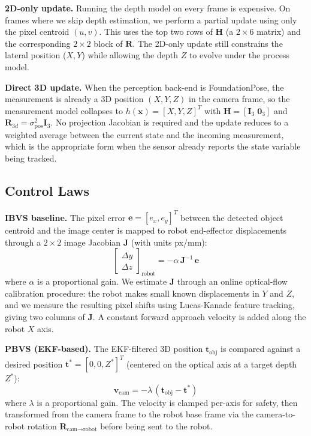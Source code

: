 \documentclass[letterpaper, 10 pt, conference]{ieeeconf}  %
\begin{document}
\textbf{2D-only update.}
Running the depth model on every frame is expensive. On frames where we skip depth estimation, we perform a partial update using only the pixel centroid $(u, v)$. This uses the top two rows of $\mathbf{H}$ (a $2 \times 6$ matrix) and the corresponding $2 \times 2$ block of $\mathbf{R}$. The 2D-only update still constrains the lateral position ($X, Y$) while allowing the depth $Z$ to evolve under the process model.

\textbf{Direct 3D update.}
When the perception back-end is FoundationPose, the measurement is already a 3D position $(X, Y, Z)$ in the camera frame, so the measurement model collapses to $h(\mathbf{x}) = [X, Y, Z]^T$ with $\mathbf{H} = [\mathbf{I}_3 \; \mathbf{0}_3]$ and $\mathbf{R}_{3d} = \sigma_{\text{pos}}^2 \mathbf{I}_3$. No projection Jacobian is required and the update reduces to a weighted average between the current state and the incoming measurement, which is the appropriate form when the sensor already reports the state variable being tracked.

\subsection{Control Laws}

\textbf{IBVS baseline.}
The pixel error $\mathbf{e} = [e_x, e_y]^T$ between the detected object centroid and the image center is mapped to robot end-effector displacements through a $2 \times 2$ image Jacobian $\mathbf{J}$ (with units px/mm):
\begin{equation}
\begin{bmatrix} \Delta y \\ \Delta z \end{bmatrix}_{\text{robot}} = -\alpha \, \mathbf{J}^{-1} \, \mathbf{e}
\end{equation}
where $\alpha$ is a proportional gain. We estimate $\mathbf{J}$ through an online optical-flow calibration procedure: the robot makes small known displacements in $Y$ and $Z$, and we measure the resulting pixel shifts using Lucas-Kanade feature tracking, giving two columns of $\mathbf{J}$. A constant forward approach velocity is added along the robot $X$ axis.

\textbf{PBVS (EKF-based).}
The EKF-filtered 3D position $\mathbf{t}_{\text{obj}}$ is compared against a desired position $\mathbf{t}^* = [0, 0, Z^*]^T$ (centered on the optical axis at a target depth $Z^*$):
\begin{equation}
\mathbf{v}_{\text{cam}} = -\lambda \, (\mathbf{t}_{\text{obj}} - \mathbf{t}^*)
\label{eq:pbvs}
\end{equation}
where $\lambda$ is a proportional gain. The velocity is clamped per-axis for safety, then transformed from the camera frame to the robot base frame via the camera-to-robot rotation $\mathbf{R}_{\text{cam} \to \text{robot}}$ before being sent to the robot.
\end{document}
